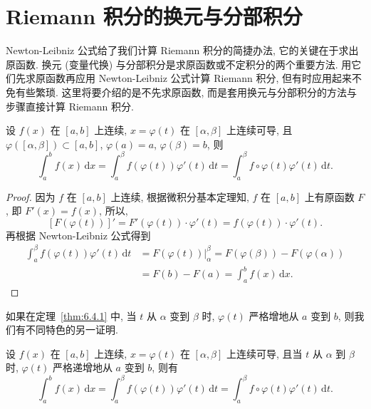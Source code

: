 \section{Riemann 积分的换元与分部积分}\label{sec:6.4}

Newton-Leibniz 公式给了我们计算 Riemann 积分的简捷办法, 它的关键在于求出原函数. 换元 (变量代换) 与分部积分是求原函数或不定积分的两个重要方法. 用它们先求原函数再应用 Newton-Leibniz 公式计算 Riemann 积分, 但有时应用起来不免有些繁琐. 这里将要介绍的是不先求原函数, 而是套用换元与分部积分的方法与步骤直接计算 Riemann 积分.

\begin{theorem}\label{thm:6.4.1}
设 $f(x)$ 在 $[a,b]$ 上连续, $x=\varphi(t)$ 在 $[\alpha,\beta]$ 上连续可导, 且 $\varphi([\alpha,\beta])\subset[a,b]$, $\varphi(a)=a$, $\varphi(\beta)=b$, 则
\[
\int_{a}^{b}f(x)\,\mathrm{d}x=\int_{a}^{\beta}f(\varphi(t))\varphi'(t)\,\mathrm{d}t=\int_{a}^{\beta}f\circ\varphi(t)\varphi'(t)\,\mathrm{d}t.
\]
\end{theorem}

\begin{proof}
因为 $f$ 在 $[a,b]$ 上连续, 根据微积分基本定理知, $f$ 在 $[a,b]$ 上有原函数 $F$, 即 $F'(x)=f(x)$, 所以,
\[
[F(\varphi(t))]'=F'(\varphi(t))\cdot\varphi'(t)=f(\varphi(t))\cdot\varphi'(t).
\]
再根据 Newton-Leibniz 公式得到
\begin{align*}
\int_{a}^{\beta}f(\varphi(t))\varphi'(t)\,\mathrm{d}t&=F(\varphi(t))\Big|_{\alpha}^{\beta}=F(\varphi(\beta))-F(\varphi(\alpha))\\
&=F(b)-F(a)=\int_{a}^{b}f(x)\,\mathrm{d}x.
\end{align*}
\end{proof}

如果在定理~\ref{thm:6.4.1} 中, 当 $t$ 从 $\alpha$ 变到 $\beta$ 时, $\varphi(t)$ 严格增地从 $a$ 变到 $b$, 则我们有不同特色的另一证明.

\begin{theoremp}\label{thm:6.4.1p}
设 $f(x)$ 在 $[a,b]$ 上连续, $x=\varphi(t)$ 在 $[\alpha,\beta]$ 上连续可导, 且当 $t$ 从 $\alpha$ 到 $\beta$ 时, $\varphi(t)$ 严格递增地从 $a$ 变到 $b$, 则有
\[
\int_{a}^{b}f(x)\,\mathrm{d}x=\int_{a}^{\beta}f(\varphi(t))\varphi'(t)\,\mathrm{d}t=\int_{a}^{\beta}f\circ\varphi(t)\varphi'(t)\,\mathrm{d}t.
\]
\end{theoremp}

